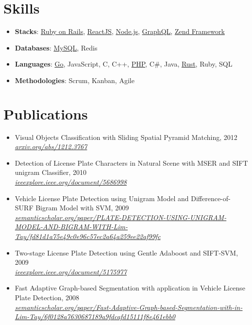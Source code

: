 \documentclass[12pt,twoside,a4paper]{article}
\newcommand{\resumeSubHeadingListStart}{\begin{itemize}[leftmargin=*]}
\newcommand{\resumeSubHeadingListEnd}{\end{itemize}}
\begin{document}
\section{Skills}
 \resumeSubHeadingListStart
   \item{
     \textbf{Stacks}{: \href{https://rubyonrails.org/}{Ruby on Rails}, \href{https://reactjs.org/}{ReactJS}, \href{https://nodejs.org/}{Node.js}, \href{https://graphql.org/}{GraphQL}, \href{https://framework.zend.com/}{Zend Framework}}
   }
   \item{
     \textbf{Databases}{: \href{https://www.mysql.com/}{MySQL}, Redis}
   }
   \item{
     \textbf{Languages}{: \href{https://golang.org/}{Go}, JavaScript, C, C++, \href{https://www.php.net/}{PHP}, C\#, Java, \href{https://www.rust-lang.org/}{Rust}, Ruby, SQL}
   }
   \item{
     \textbf{Methodologies}{: Scrum, Kanban, Agile}
   }
 \resumeSubHeadingListEnd

\section{Publications}
 \resumeSubHeadingListStart
   \item{
     {Visual Objects Classification with Sliding Spatial Pyramid Matching, 2012}{\\\textit{\href{https://arxiv.org/abs/1212.3767}{arxiv.org/abs/1212.3767}}}
   }
   \item{
     {Detection of License Plate Characters in Natural Scene with MSER and SIFT unigram Classifier, 2010}{\\\textit{\href{https://ieeexplore.ieee.org/document/5686998}{ieeexplore.ieee.org/document/5686998}}}
   }
   \item{
     {Vehicle License Plate Detection using Unigram Model and Difference-of-SURF Bigram Model with SVM, 2009}{\\\textit{\href{https://www.semanticscholar.org/paper/PLATE-DETECTION-USING-UNIGRAM-MODEL-AND-BIGRAM-WITH-Lim-Tay/fd81d1a75e49c0e96c57ec2a64a259ee22af99fc}{semanticscholar.org/paper/PLATE-DETECTION-USING-UNIGRAM-MODEL-AND-BIGRAM-WITH-Lim-Tay/fd81d1a75e49c0e96c57ec2a64a259ee22af99fc}}}
   }
   \item{
     {Two-stage License Plate Detection using Gentle Adaboost and SIFT-SVM, 2009}{\\\textit{\href{https://ieeexplore.ieee.org/document/5175977}{ieeexplore.ieee.org/document/5175977}}}
   }
   \item{
     {Fast Adaptive Graph-based Segmentation with application in Vehicle License Plate Detection, 2008}{\\\textit{\href{https://www.semanticscholar.org/paper/Fast-Adaptive-Graph-based-Segmentation-with-in-Lim-Tay/6f0128a7630687189a9fdcafd15111f8e461ebb0}{semanticscholar.org/paper/Fast-Adaptive-Graph-based-Segmentation-with-in-Lim-Tay/6f0128a7630687189a9fdcafd15111f8e461ebb0}}}
   }
 \resumeSubHeadingListEnd

\end{document}
